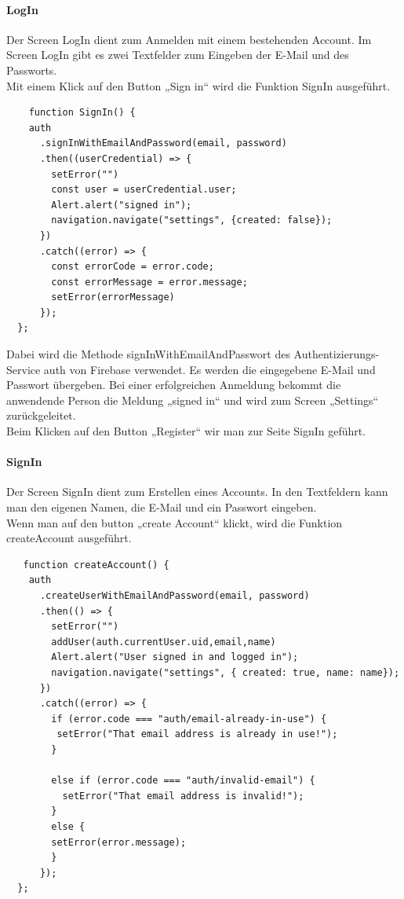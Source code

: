 \paragraph{LogIn}Der Screen LogIn dient zum Anmelden mit einem bestehenden Account. Im Screen LogIn gibt es zwei Textfelder zum Eingeben der E-Mail und des Passworts. \\
Mit einem Klick auf den Button „Sign in“ wird die Funktion SignIn ausgeführt. \\
\begin{verbatim}
    function SignIn() {
    auth
      .signInWithEmailAndPassword(email, password)
      .then((userCredential) => {
        setError("")
        const user = userCredential.user;
        Alert.alert("signed in");
        navigation.navigate("settings", {created: false});
      })
      .catch((error) => {
        const errorCode = error.code;
        const errorMessage = error.message;
        setError(errorMessage)
      });
  };
\end{verbatim}

Dabei wird die Methode signInWithEmailAndPasswort des Authentizierungs-Service auth von Firebase verwendet. Es werden die eingegebene E-Mail und Passwort übergeben. Bei einer erfolgreichen Anmeldung bekommt die anwendende Person die Meldung „signed in“ und wird zum Screen „Settings“ zurückgeleitet.\\
Beim Klicken auf den Button „Register“ wir man zur Seite SignIn geführt.\\


\paragraph{SignIn}Der Screen SignIn dient zum Erstellen eines Accounts. In den Textfeldern kann man den eigenen Namen, die E-Mail und ein Passwort eingeben.\\
Wenn man auf den button „create Account“ klickt, wird die Funktion createAccount ausgeführt.\\
\begin{verbatim}
   function createAccount() {
    auth
      .createUserWithEmailAndPassword(email, password)
      .then(() => {
        setError("")
        addUser(auth.currentUser.uid,email,name)
        Alert.alert("User signed in and logged in");
        navigation.navigate("settings", { created: true, name: name});
      })
      .catch((error) => {
        if (error.code === "auth/email-already-in-use") {
         setError("That email address is already in use!");
        }

        else if (error.code === "auth/invalid-email") {
          setError("That email address is invalid!");
        }
        else {
        setError(error.message);
        }
      });
  };
\end{verbatim}

